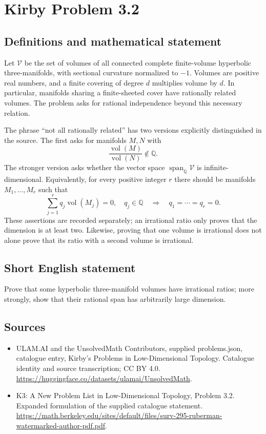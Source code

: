 \documentclass[11pt,a4paper]{article}
\begin{document}
\section*{Kirby Problem 3.2}\label{statement}

\subsection{Definitions and mathematical statement}
Let $\mathcal V$ be the set of volumes of all connected complete finite-volume
hyperbolic three-manifolds, with sectional curvature normalized to $-1$.
Volumes are positive real numbers, and a finite covering of degree $d$
multiplies volume by $d$. In particular, manifolds sharing a finite-sheeted
cover have rationally related volumes. The problem asks for rational
independence beyond this necessary relation.

The phrase ``not all rationally related'' has two versions explicitly
distinguished in the source. The first asks for manifolds $M,N$ with
\[
 \frac{\operatorname{vol}(M)}{\operatorname{vol}(N)}\notin\mathbb Q.
\]
The stronger version asks whether the vector space
$\operatorname{span}_{\mathbb Q}\mathcal V$ is infinite-dimensional.
Equivalently, for every positive integer $r$ there should be manifolds
$M_1,\ldots,M_r$ such that
\[
 \sum_{j=1}^r q_j\operatorname{vol}(M_j)=0,
 \quad q_j\in\mathbb Q
 \quad\Longrightarrow\quad q_1=\cdots=q_r=0.
\]
These assertions are recorded separately; an irrational ratio only proves
that the dimension is at least two. Likewise, proving that one volume is
irrational does not alone prove that its ratio with a second volume is irrational.
\subsection{Short English statement}
Prove that some hyperbolic three-manifold volumes have irrational ratios; more strongly, show that their rational span has arbitrarily large dimension.
\subsection{Sources}
\begin{itemize}
\item[S1] ULAM.AI and the UnsolvedMath Contributors, supplied problems.json, catalogue entry, Kirby's Problems in Low-Dimensional Topology. Catalogue identity and source transcription; CC BY 4.0.
\url{https://huggingface.co/datasets/ulamai/UnsolvedMath}.
\item[S2] K3: A New Problem List in Low-Dimensional Topology, Problem 3.2. Expanded formulation of the supplied catalogue statement.
\url{https://math.berkeley.edu/sites/default/files/surv-295-ruberman-watermarked-author-pdf.pdf}.
\end{itemize}
\end{document}
